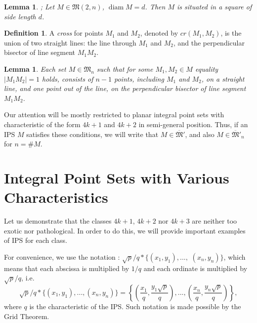 \documentclass[a4paper,14pt]{article} %
\theoremstyle{plain}
\newtheorem{lemma}[theorem]{Lemma}
\theoremstyle{definition}
\newtheorem{definition}[theorem]{Definition}
\begin{document}
\begin{lemma}
	\cite[Lemma 4]{our-vmmsh-2018-translit};
	\cite[Lemma 2.4]{my-pps-linear-bound-2019}
	\label{lem:square_container}
	Let $M\in\mathfrak{M}(2,n)$, $\operatorname{diam} M = d$.
	Then $M$ is situated in a square of side length $d$.
\end{lemma}

\begin{definition}
	\cite[Definition 2.5]{my-pps-linear-bound-2019}
	A \textit{cross} for points $M_1$ and $M_2$, denoted by $cr(M_1,M_2)$, is the union of two straight lines:
	the line through $M_1$ and $M_2$,
	and the perpendicular bisector of line segment $M_1 M_2$.
\end{definition}

\begin{lemma}
	\cite[Theorem 3.10]{my-pps-linear-bound-2019}
	\label{lem:no_distance_one}
	Each set $M\in\mathfrak{M}_n$
	such that for some $M_1,M_2 \in M$ equality $|M_1 M_2|=1$ holds,
	consists of $n-1$ points, including $M_1$ and $M_2$, on a straight line,
	and one point out of the line, on the perpendicular bisector of line segment $M_1 M_2$.
\end{lemma}



Our attention will be mostly restricted to planar integral point sets
with characteristic of the form $4k+1$ and $4k+2$ in semi-general position.
Thus, if an IPS $M$ satisfies these conditions,
we will write that
$M\in\overline{\mathfrak{M}}'$, and also $M\in\overline{\mathfrak{M}}'_n$ for $n=\#M$.





\section{Integral Point Sets with Various Characteristics}

Let us demonstrate that the classes $4k+1$, $4k+2$ nor $4k+3$
are neither too exotic nor pathological.
In order to do this, we will provide important examples of IPS for each class.

For convenience, we use the notation \cite{our-ped-2018,our-pmm-2018,our-vmmsh-2018}:
$\sqrt{p}/q * \{ (x_1,y_1), ...,$ $ (x_n, y_n)  \}$,
which means that each abscissa is multiplied by $1/q$
and each ordinate is multiplied by $\sqrt{p}/q$,  i.e.
\begin{equation}
	\label{eq:char_lattice}
	\sqrt{p}/q * \{ (x_1,y_1), ..., (x_n, y_n)  \}
	=
	\left\{ \left(\frac{x_1}{q},\frac{y_1\sqrt{p}}{q}\right), ..., \left(\frac{x_n}{q},   \frac{y_n\sqrt{p}}{q}\right)  \right\}
	,
\end{equation}
where $q$ is the characteristic of the IPS.
Such notation is made possible by the Grid Theorem.
\end{document}
